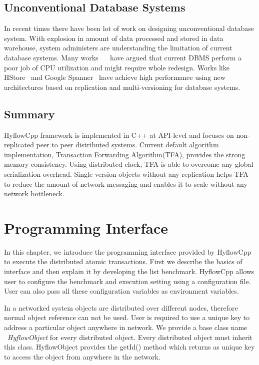 \documentclass[12pt,english]{report}
\begin{document}
\section{Unconventional Database Systems}
In recent times there have been lot of work on designing unconventional database system. With explosion in amount of data processed and stored in data warehouse, system administers are understanding the limitation of current database systems. Many works ~\cite{Stonebraker:2007:EAE:1325851.1325981}~\cite{harizopoulos2008oltp} have argued that current DBMS perform a poor job of CPU utilization and might require whole redesign. Works like HStore~\cite{HSTORE:kallman2008h} and Google Spanner~\cite{corbett2012spanner} have achieve high performance using new architectures based on replication and multi-versioning for database systems. 

\section{Summary}
HyflowCpp framework is implemented in C++ at API-level and focuses on non-replicated peer to peer distributed systems. Current default algorithm implementation, Transaction Forwarding Algorithm(TFA), provides the strong memory consistency. Using distributed clock, TFA is able to overcome any global serialization overhead. Single version objects without any replication helps TFA to reduce the amount of network messaging and enables it to scale without any network bottleneck.

\chapter{Programming Interface}\label{chap:progInterface}

In this chapter, we introduce the programming interface provided by HyflowCpp to execute the distributed atomic transactions. First we describe the basics of interface and then explain it by developing the list benchmark. HyflowCpp allows user to configure the benchmark and execution setting using a configuration file. User can also pass all these configuration variables as environment variables.

In a networked system objects are distributed over different nodes, therefore normal object reference can not be used. User is required to use a unique key to address a particular object anywhere in network. We provide a base class name ~\emph{HyflowObject} for every distributed object. Every distributed object must inherit this class. HyflowObject provides the getId() method which returns as unique key to access the object from anywhere in the network.
\end{document}

